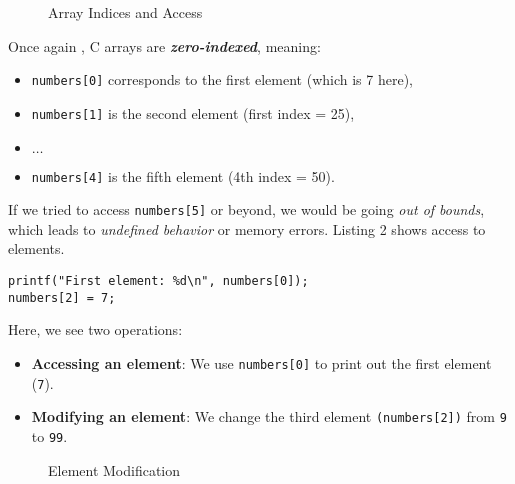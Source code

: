 \documentclass[a4paper,12pt]{article}
\begin{document}
\begin{figure}[H]
    \centering

    \caption{Array Indices and Access}
    \label{fig:enter-label}
\end{figure}

Once again
, C arrays are \textbf{\textit{zero-indexed}}, meaning:
\begin{itemize}
  \item \verb|numbers[0]| corresponds to the first element (which is 7 here),
  \item \verb|numbers[1]| is the second element (first index = 25),
  \item \(\ldots\)
  \item \verb|numbers[4]| is the fifth element (4th index = 50).
\end{itemize}
If we tried to access \verb|numbers[5]| or beyond, we would be going \emph{out of bounds}, which leads to \emph{undefined behavior} or memory errors. Listing 2 shows access to elements.

\begin{lstlisting}[caption=Element modification and access]
printf("First element: %d\n", numbers[0]);
numbers[2] = 7;
\end{lstlisting}

Here, we see two operations:
\begin{itemize}
  \item \textbf{Accessing an element}: We use \verb|numbers[0]| to print out the first element (\verb|7|).
  \item \textbf{Modifying an element}: We change the third element \verb|(numbers[2])| from \verb|9| to \verb|99|.
\end{itemize}

\begin{figure}[H]
    \centering
    \caption{Element Modification}
    \label{fig:enter-label}
\end{figure}
\end{document}

